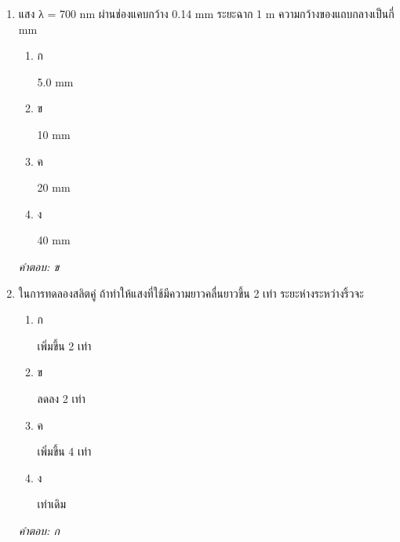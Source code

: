 \documentclass[12pt]{article}
\begin{document}
\begin{enumerate}[label=\arabic*., itemsep=0.5\baselineskip, topsep=0.5\baselineskip, leftmargin=*]
\item แสง λ = 700 nm ผ่านช่องแคบกว้าง 0.14 mm ระยะฉาก 1 m ความกว้างของแถบกลางเป็นกี่ mm
\begin{enumerate}[label=\alph*)., itemsep=0.3\baselineskip, topsep=0.3\baselineskip]
\item ก\ 
\begin{minipage}[t]{0.9\linewidth}
\raggedright 5.0 mm
\end{minipage}
\item ข\ 
\begin{minipage}[t]{0.9\linewidth}
\raggedright 10 mm
\end{minipage}
\item ค\ 
\begin{minipage}[t]{0.9\linewidth}
\raggedright 20 mm
\end{minipage}
\item ง\ 
\begin{minipage}[t]{0.9\linewidth}
\raggedright 40 mm
\end{minipage}
\end{enumerate}
\vspace{-0.3\baselineskip}
\begin{small}
\textit{คำตอบ: ข}
\end{small}

\item ในการทดลองสลิตคู่ ถ้าทำให้แสงที่ใช้มีความยาวคลื่นยาวขึ้น 2 เท่า ระยะห่างระหว่างริ้วจะ
\begin{enumerate}[label=\alph*)., itemsep=0.3\baselineskip, topsep=0.3\baselineskip]
\item ก\ 
\begin{minipage}[t]{0.9\linewidth}
\raggedright เพิ่มขึ้น 2 เท่า
\end{minipage}
\item ข\ 
\begin{minipage}[t]{0.9\linewidth}
\raggedright ลดลง 2 เท่า
\end{minipage}
\item ค\ 
\begin{minipage}[t]{0.9\linewidth}
\raggedright เพิ่มขึ้น 4 เท่า
\end{minipage}
\item ง\ 
\begin{minipage}[t]{0.9\linewidth}
\raggedright เท่าเดิม
\end{minipage}
\end{enumerate}
\vspace{-0.3\baselineskip}
\begin{small}
\textit{คำตอบ: ก}
\end{small}

\end{enumerate}
\end{document}

